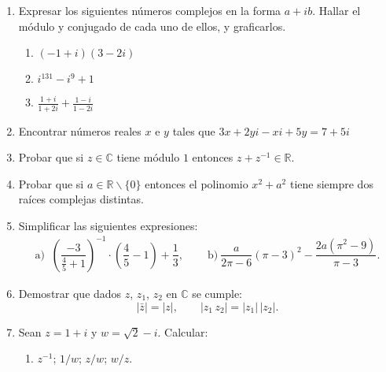 \documentclass[a4paper,12pt,twoside,spanish,reqno]{amsbook}
\numberwithin{equation}{section}
\newcommand \C{{\mathbb C}}
\begin{document}
\begin{enumerate}

\item Expresar los siguientes números complejos en la forma $a +i b$.
Hallar el módulo y conjugado de cada uno de ellos, y graficarlos.

\begin{multicols}{3}
\begin{enumerate}
\item $(-1+i) (3-2i)$
\item $i^{131} - i^9 +1$
\item $\frac {1+i}{1+2i} + \frac{1-i}{1-2i}$
\end{enumerate}
\end{multicols}

\vspace{.5cm}


\item Encontrar números reales $x$ e $y$ tales que $3x+2yi-xi+5y = 7 + 5i$


\vspace{.5cm}

\item Probar que si $z \in \mathbb{C}$ tiene módulo $1$ entonces $z + z^{-1} \in \mathbb{R}.$

\vspace{.5cm}

\item Probar que si $a\in \mathbb{R}\backslash \{0\}$ entonces el polinomio $x^2+a^2$ tiene siempre dos raíces complejas distintas.

\vspace{.5cm}

\item
Simplificar las siguientes expresiones:
$$\begin{array}{ll}
 \text{a) } \ \left(\dfrac{-3}{\frac{4}{5}+1}\right)^{-1}\cdot\left(\dfrac{4}{5}-1\right) + \dfrac{1}{3}, \quad &
\text{ b)} \ \dfrac{a}{2\pi-6}(\pi-3)^2 -\dfrac{2a(\pi^2-9)}{\pi-3}.
\end{array}$$

\vspace{.5cm}


\item Demostrar que  dados $z$, $z_1$, $z_2$ en $\C$ se cumple:
\[ |\bar z|= |z|, \qquad |z_1 \, z_2|= |z_1| \, |z_2|. \]

\vspace{.5cm}


\item Sean $z=1+i$ y $w=\sqrt{2}-i$. Calcular:
 \begin{enumerate}
  \item $z^{-1}$; $1/w$; $z/w$; $w/z$.


\end{enumerate}
\end{enumerate}
\end{document}
